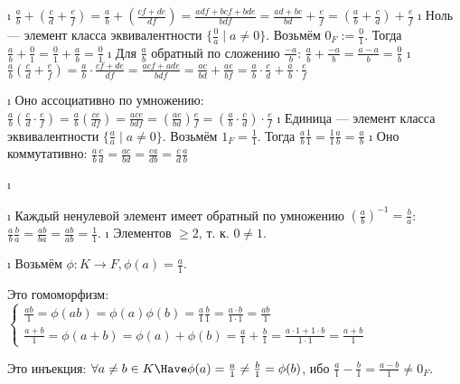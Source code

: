 \begin{solution}
\begin{enumerate}[label=\asbuk{enumi})]
\begin{itemize}
    \begin{itemize}
    \tightlist
    \i
      \(\frac{a}{b} + (\frac{c}{d} + \frac{e}{f}) = \frac{a}{b} + (\frac{cf+de}{df}) = \frac{adf+bcf+bde}{bdf} = \frac{ad+bc}{bd}+\frac{e}{f} = (\frac{a}{b} + \frac{c}{d}) + \frac{e}{f}\)
    \i
      Ноль --- элемент класса эквивалентности \(\{\frac{0}{a} \mid a \ne 0\}\). Возьмём \(0_F := \frac{0}{1}\). Тогда \(\frac{a}{b} + \frac{0}{1} = \frac{0}{1} + \frac{a}{b} = \frac{0}{1}\)
    \i
      Для \(\frac{a}{b}\) обратный по сложению \(\frac{-a}{b}\): \(\frac{a}{b}+\frac{-a}{b} = \frac{a-a}{b} = \frac{0}{b}\)
    \i
      \(\frac{a}{b} (\frac{c}{d} + \frac{e}{f}) = \frac{a}{b} \cdot \frac{cf+de}{df} = \frac{acf+ade}{bdf} = \frac{ac}{bd}+\frac{ae}{bf} = \frac{a}{b}\cdot \frac{c}{d}+\frac{a}{b} \cdot \frac{e}{f}\)
    \end{itemize}
  \i
    Оно ассоциативно по умножению: \(\frac{a}{b} (\frac{c}{d} \cdot \frac{e}{f}) = \frac{a}{b} (\frac{ce}{df} ) = \frac{ace}{bdf} = (\frac{ac}{bd}) \frac{e}{f} = (\frac{a}{b} \cdot \frac{c}{d}) \cdot \frac{e}{f}\)
  \i
    Единица --- элемент класса эквивалентности \(\{\frac{a}{a} \mid a \ne 0\}\). Возьмём \(1_F = \frac{1}{1}\). Тогда \(\frac{a}{b} \frac{1}{1} = \frac{1}{1} \frac{a}{b} = \frac{a}{b}\)
  \i
    Оно коммутативно: \(\frac{a}{b} \frac{c}{d} = \frac{ac}{bd} = \frac{ca}{db} = \frac{c}{d} \frac{a}{b}\)
  \end{itemize}
\i
  \begin{itemize}
  \tightlist
  \i
    Каждый ненулевой элемент имеет обратный по умножению \((\frac{a}{b})^{-1} = \frac{b}{a}\): \(\frac{a}{b} \frac{b}{a} = \frac{ab}{ba} = \frac{ab}{ab} = \frac{1}{1}\).
  \i
    Элементов \(\ge 2\), т. к. \(0 \ne 1\).
  \end{itemize}
\i
  Возьмём \(\phi: K \to F, \phi(a) = \frac{a}{1}\).

  Это гомоморфизм: 
  $\begin{cases} 
    \frac{ab}{1} = \phi(ab) = \phi(a)\phi(b) = \frac{a}{1}\frac{b}{1} = \frac{a\cdot b}{1\cdot 1} = \frac{ab}{1}\\
    \frac{a+b}{1} = \phi(a+b) = \phi(a)+\phi(b) = \frac{a}{1}+\frac{b}{1} = \frac{a\cdot 1+1 \cdot b}{1\cdot 1} = \frac{a+b}{1}
  \end{cases}$

  Это инъекция: \(\forall a \ne b \in K \Have \phi(a) = \frac{a}{1} \ne \frac{b}{1} = \phi(b)\), ибо \(\frac{a}{1} - \frac{b}{1} = \frac{a-b}{1} \ne 0_F\).
\end{enumerate}

\end{solution}

